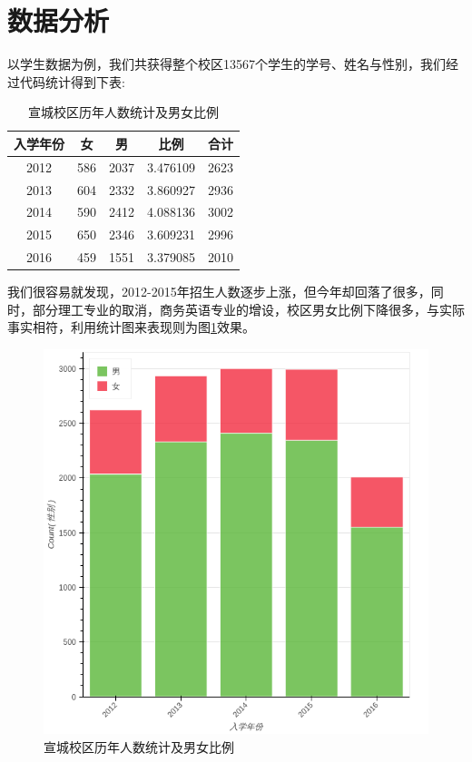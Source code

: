\documentclass[UTF8, zihao=-4]{ctexart}
\begin{document}
     
    
    \section{数据分析}
    
    以学生数据为例，我们共获得整个校区13567个学生的学号、姓名与性别，我们经过代码统计得到下表:
    
    \begin{table}[htbp]
        \centering
        \begin{tabular}{ccccc}
            \toprule
            入学年份 &女&	男&	比例&	合计\\
            \midrule
            2012&	586&	2037&	3.476109&	2623\\
            2013&	604&	2332&	3.860927&	2936\\
            2014&	590&	2412&	4.088136&	3002\\
            2015&	650&	2346&	3.609231&	2996\\
            2016&	459&	1551&	3.379085&	2010\\
        \end{tabular}
        \caption{宣城校区历年人数统计及男女比例}
    \end{table}
    
    我们很容易就发现，2012-2015年招生人数逐步上涨，但今年却回落了很多，同时，部分理工专业的取消，商务英语专业的增设，校区男女比例下降很多，与实际事实相符，利用统计图来表现则为图\ref{fig:sex_plot}效果。
    
    \begin{figure}
        \centering
        \includegraphics[width=0.7\linewidth]{figure/sex_plot}
        \caption{宣城校区历年人数统计及男女比例}
        \label{fig:sex_plot}
    \end{figure}
    
\end{document}
